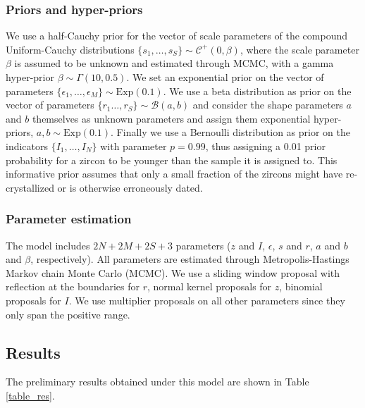\documentclass[12pt,letterpaper]{article}
\begin{document}
\subsubsection{Priors and hyper-priors}
We use a half-Cauchy prior for the vector of scale parameters of the compound Uniform-Cauchy distributions $\{s_1, \dots, s_S \} \sim \mathcal{C}^+(0, \beta)$, where the scale parameter $\beta$ is assumed to be unknown and estimated through MCMC, with a gamma hyper-prior $\beta \sim \Gamma(10, 0.5)$. 
We set an exponential prior on the vector of parameters $\{\epsilon_1, \dots, \epsilon_M \} \sim \text{Exp}(0.1)$.
We use a beta distribution as prior on the vector of parameters $\{r_1 \dots, r_S\} \sim \mathcal{B}(a, b)$ and consider the shape parameters $a$ and $b$ themselves as unknown parameters and assign them exponential hyper-priors, $a, b \sim \text{Exp}(0.1)$.
Finally we use a Bernoulli distribution as prior on the indicators $\{I_1, \dots, I_N\}$ with parameter $p = 0.99$, thus assigning a 0.01 prior probability for a zircon to be younger than the sample it is assigned to. This informative prior assumes that only a small fraction of the zircons might have re-crystallized or is otherwise erroneously dated. 

\subsubsection{Parameter estimation}
The model includes $2N + 2M + 2S + 3$ parameters ($z$ and $I$, $\epsilon$, $s$ and $r$, $a$ and $b$ and $\beta$, respectively). 
All parameters are estimated through Metropolis-Hastings Markov chain Monte Carlo (MCMC). We use a sliding window proposal with reflection at the boundaries for $r$, normal kernel proposals for $z$, binomial proposals for $I$. We use multiplier proposals on all other parameters since they only span the positive range. 

\clearpage
\subsection{Results}
The preliminary results obtained under this model are shown in Table \ref{table_res}. 
\end{document}
